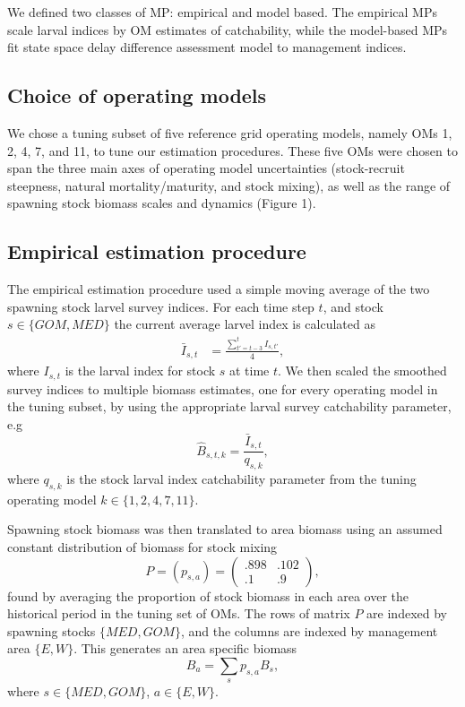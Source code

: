 \documentclass[]{article}
\begin{document}
We defined two classes of MP: empirical and model based. The empirical MPs
scale larval indices by OM estimates of catchability, while the
model-based MPs fit state space delay difference assessment model
to management indices.

\hypertarget{choice-of-operating-models}{%
\subsection{Choice of operating models}\label{choice-of-operating-models}}

We chose a tuning subset of five reference grid operating models,
namely OMs 1, 2, 4, 7, and 11, to tune our estimation procedures.
These five OMs were chosen to span the three main axes
of operating model uncertainties (stock-recruit steepness, natural
mortality/maturity, and stock mixing), as well as the range of spawning
stock biomass scales and dynamics (Figure 1).

\hypertarget{empirical-estimation-procedure}{%
\subsection{Empirical estimation procedure}\label{empirical-estimation-procedure}}

The empirical estimation procedure used a simple moving average of
the two spawning stock larvel survey indices. For each time step \(t\),
and stock \(s \in \{GOM, MED\}\) the current average larvel index is
calculated as
\begin{align}
\bar{I}_{s,t} & = \frac{\sum_{t'= t-3}^{t} I_{s,t'}}{4}, 
\end{align}
where \(I_{s,t}\) is the larval index for stock \(s\) at time \(t\). We then
scaled the smoothed survey indices to multiple biomass estimates, one
for every operating model in the tuning subset, by using the appropriate
larval survey catchability parameter, e.g
\begin{equation}
\hat{B}_{s,t,k} = \frac{\bar{I}_{s,t}}{q_{s,k}},
\end{equation}
where \(q_{s,k}\) is the stock larval index catchability parameter from
the tuning operating model \(k \in \{1,2,4,7,11\}\).

Spawning stock biomass was then translated to area biomass using an
assumed constant distribution of biomass for stock mixing
\begin{equation}
P = (p_{s,a}) =  \left( \begin{array}{cc}
                .898 & .102 \\
                .1 & .9
            \end{array}
    \right),                    
\end{equation}
found by averaging the proportion of stock biomass in each area
over the historical period in the tuning set of OMs. The rows
of matrix \(P\) are indexed by spawning stocks \(\{MED, GOM\}\), and the
columns are indexed by management area \(\{ E, W\}\). This generates
an area specific biomass
\begin{equation}
B_a = \sum_{s} p_{s,a} B_s,
\end{equation}
where \(s \in \{MED, GOM\}\), \(a \in \{E, W\}\).
\end{document}
